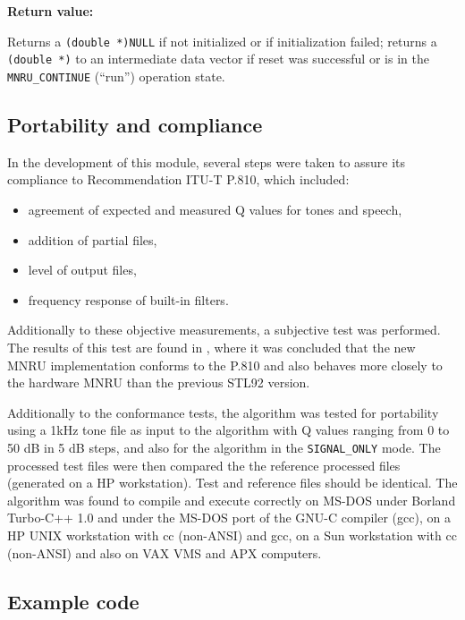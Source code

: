 {\bf Return value: }

Returns a {\tt (double *)NULL} if not initialized or if initialization
failed; returns a {\tt (double *)} to an intermediate data vector if reset
was successful or is in the {\tt MNRU\_CONTINUE} (``run'') operation
state.


\subsection{Portability and compliance} \label{MNRU-Tests}

In the development of this module, several steps were taken to assure
its compliance to Recommendation ITU-T P.810, which included:

\begin{itemize}
  \item agreement of expected and measured Q values for tones and
        speech,
  \item addition of partial files,
  \item level of output files,
  \item frequency response of built-in filters.
\end{itemize}

Additionally to these objective measurements, a subjective test was
performed. The results of this test are found in \cite{Duo-MNRU},
where it was concluded that the new MNRU implementation conforms to
the P.810 and also behaves more closely to the hardware MNRU
than the previous STL92 version.

Additionally to the conformance tests, the algorithm was tested for
portability using a 1kHz tone file as input to the algorithm with Q
values ranging from 0 to 50 dB in 5 dB steps, and also for the
algorithm in the {\tt SIGNAL\_ONLY} mode. The processed test files were
then compared the the reference processed files (generated on a HP
workstation). Test and reference files should be identical.
The algorithm was found to compile and execute correctly on MS-DOS
under Borland Turbo-C++ 1.0 and under the MS-DOS port of the GNU-C
compiler (gcc), on a HP UNIX workstation with cc (non-ANSI) and gcc,
on a Sun workstation with cc (non-ANSI) and also on VAX VMS and APX
computers.


\subsection{Example code}

